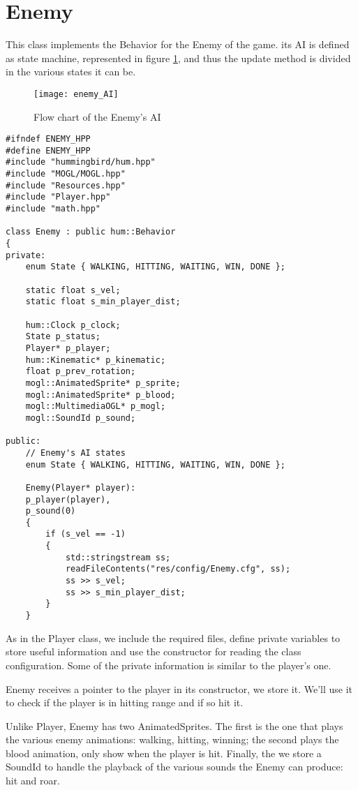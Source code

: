 \section{Enemy}

This class implements the Behavior for the Enemy of the game. its AI is defined as 
state machine, represented in figure \ref{fig:enemy_AI}, and thus the update method is divided in the various states it can be. 

\begin{figure}[h]
    \centering
    \texttt{[image: enemy\_AI]}
    \caption{Flow chart of the Enemy's AI}
    \label{fig:enemy_AI}
\end{figure}

\begin{lstlisting}
#ifndef ENEMY_HPP
#define ENEMY_HPP
#include "hummingbird/hum.hpp"
#include "MOGL/MOGL.hpp"
#include "Resources.hpp"
#include "Player.hpp"
#include "math.hpp"

class Enemy : public hum::Behavior
{
private:
    enum State { WALKING, HITTING, WAITING, WIN, DONE };

    static float s_vel;
    static float s_min_player_dist;

    hum::Clock p_clock;
    State p_status;
    Player* p_player;
    hum::Kinematic* p_kinematic;
    float p_prev_rotation;
    mogl::AnimatedSprite* p_sprite;
    mogl::AnimatedSprite* p_blood;
    mogl::MultimediaOGL* p_mogl;
    mogl::SoundId p_sound;

public:
    // Enemy's AI states
    enum State { WALKING, HITTING, WAITING, WIN, DONE };

    Enemy(Player* player):
    p_player(player),
    p_sound(0)
    {
        if (s_vel == -1)
        {
            std::stringstream ss;
            readFileContents("res/config/Enemy.cfg", ss);
            ss >> s_vel;
            ss >> s_min_player_dist;
        }
    }
\end{lstlisting}

As in the Player class, we include the required files, define private variables to 
store useful information and use the constructor for reading the class configuration. Some 
of the private information is similar to the player's one.

Enemy receives a pointer to the player in its constructor, we store it. We'll use it 
to check if the player is in hitting range and if so hit it.

Unlike Player, Enemy has two AnimatedSprites. The first is the one that plays the various 
enemy animations: walking, hitting, winning; the second plays the blood animation, only 
show when the player is hit. Finally, the we store a SoundId to handle the playback of 
the various sounds the Enemy can produce: hit and roar.

